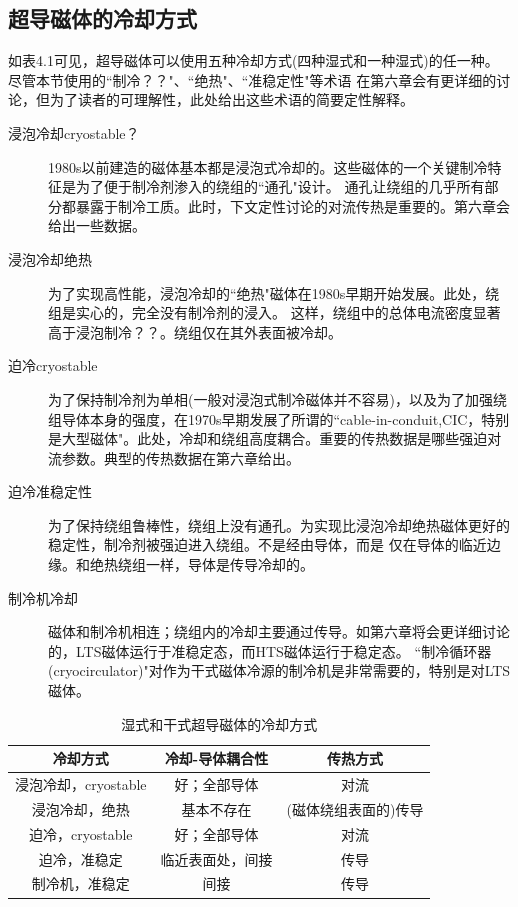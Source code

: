 \subsection*{超导磁体的冷却方式}
如表4.1可见，超导磁体可以使用五种冷却方式(四种湿式和一种湿式)的任一种。尽管本节使用的``制冷？？"、``绝热"、``准稳定性"等术语
在第六章会有更详细的讨论，但为了读者的可理解性，此处给出这些术语的简要定性解释。
\begin{description}
  \item[浸泡冷却cryostable？] 1980s以前建造的磁体基本都是浸泡式冷却的。这些磁体的一个关键制冷特征是为了便于制冷剂渗入的绕组的``通孔"设计。
  通孔让绕组的几乎所有部分都暴露于制冷工质。此时，下文定性讨论的对流传热是重要的。第六章会给出一些数据。
  \item[浸泡冷却绝热] 为了实现高性能，浸泡冷却的``绝热"磁体在1980s早期开始发展。此处，绕组是实心的，完全没有制冷剂的浸入。
  这样，绕组中的总体电流密度显著高于浸泡制冷？？。绕组仅在其外表面被冷却。
  \item[迫冷cryostable] 为了保持制冷剂为单相(一般对浸泡式制冷磁体并不容易)，以及为了加强绕组导体本身的强度，在1970s早期发展了所谓的``cable-in-conduit,CIC，特别是大型磁体"。此处，冷却和绕组高度耦合。重要的传热数据是哪些强迫对流参数。典型的传热数据在第六章给出。
  \item[迫冷准稳定性] 为了保持绕组鲁棒性，绕组上没有通孔。为实现比浸泡冷却绝热磁体更好的稳定性，制冷剂被强迫进入绕组。不是经由导体，而是
  仅在导体的临近边缘。和绝热绕组一样，导体是传导冷却的。
  \item[制冷机冷却] 磁体和制冷机相连；绕组内的冷却主要通过传导。如第六章将会更详细讨论的，LTS磁体运行于准稳定态，而HTS磁体运行于稳定态。
  ``制冷循环器(cryocirculator)"对作为干式磁体冷源的制冷机是非常需要的，特别是对LTS磁体。
\end{description}


\begin{table}[htbp]\small
  \centering
  \caption{湿式和干式超导磁体的冷却方式} \label{coolingmethod}
\begin{tabular}{|c|c|c|}
  \hline
\textbf{冷却方式}&\textbf{冷却-导体耦合性}&\textbf{传热方式} \\ \hline
浸泡冷却，cryostable & 好；全部导体& 对流\\ \hline
浸泡冷却，绝热 & 基本不存在 &(磁体绕组表面的)传导 \\ \hline
迫冷，cryostable &好；全部导体&对流\\ \hline
迫冷，准稳定 &临近表面处，间接&传导\\ \hline\hline
制冷机，准稳定&间接 &传导 \\ \hline
\end{tabular}
\end{table}

